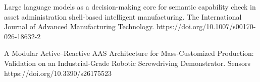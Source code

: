 

\cvPublication
  {Large language models as a decision-making core for semantic capability
   check in asset administration shell-based intelligent manufacturing.}
  {The International Journal of Advanced Manufacturing Technology.}
  {https://doi.org/10.1007/s00170-026-18632-2}

\cvPublication
  {A Modular Active–Reactive AAS Architecture for Mass-Customized Production:
   Validation on an Industrial-Grade Robotic Screwdriving Demonstrator.}
  {Sensors}
  {https://doi.org/10.3390/s26175523}
